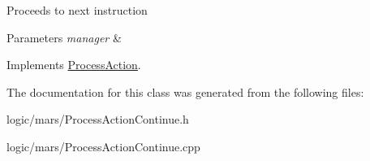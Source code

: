 Proceeds to next instruction 
\begin{DoxyParams}{Parameters}
{\em manager} & \\
\hline
\end{DoxyParams}


Implements \hyperlink{classProcessAction}{Process\+Action}.



The documentation for this class was generated from the following files\+:\begin{DoxyCompactItemize}
\item 
logic/mars/Process\+Action\+Continue.\+h\item 
logic/mars/Process\+Action\+Continue.\+cpp\end{DoxyCompactItemize}
